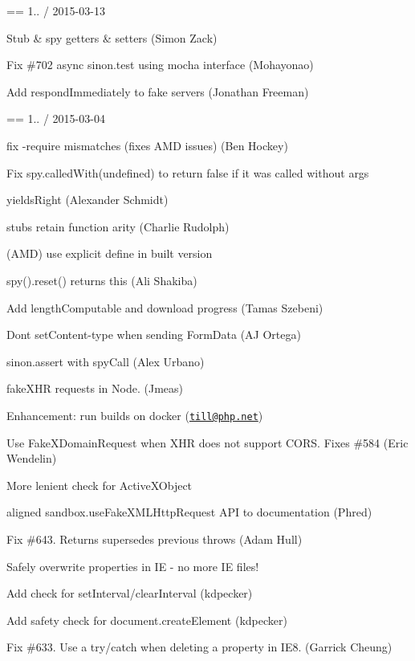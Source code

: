 == 1.. / 2015-\/03-\/13
\begin{DoxyItemize}
\item Stub \& spy getters \& setters (Simon Zack)
\item Fix \#702 async sinon.\+test using mocha interface (Mohayonao)
\item Add respond\+Immediately to fake servers (Jonathan Freeman)
\end{DoxyItemize}

== 1.. / 2015-\/03-\/04
\begin{DoxyItemize}
\item fix -\/require mismatches (fixes A\+MD issues) (Ben Hockey)
\item Fix spy.\+called\+With(undefined) to return false if it was called without args
\item yields\+Right (Alexander Schmidt)
\item stubs retain function arity (Charlie Rudolph)
\item (A\+MD) use explicit define in built version
\item spy().reset() returns this (Ali Shakiba)
\item Add length\+Computable and download progress (Tamas Szebeni)
\item Don\textquotesingle{}t set\+Content-\/type when sending Form\+Data (AJ Ortega)
\item sinon.\+assert with spy\+Call (Alex Urbano)
\item fake\+X\+HR requests in Node. (Jmeas)
\item Enhancement\+: run builds on docker (\href{mailto:till@php.net}{\tt till@php.\+net})
\item Use Fake\+X\+Domain\+Request when X\+HR does not support C\+O\+RS. Fixes \#584 (Eric Wendelin)
\item More lenient check for Active\+X\+Object
\item aligned sandbox.\+use\+Fake\+X\+M\+L\+Http\+Request A\+PI to documentation (Phred)
\item Fix \#643. Returns supersedes previous throws (Adam Hull)
\item Safely overwrite properties in IE -\/ no more IE files!
\item Add check for set\+Interval/clear\+Interval (kdpecker)
\item Add safety check for document.\+create\+Element (kdpecker)
\item Fix \#633. Use a try/catch when deleting a property in I\+E8. (Garrick Cheung)
\end{DoxyItemize}

